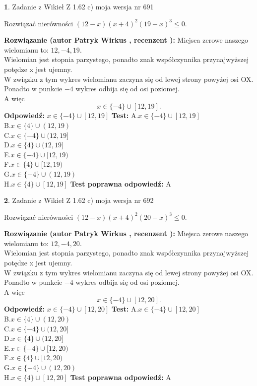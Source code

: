 \documentclass[12pt, a4paper]{article}
\theoremstyle{definition} %
\newtheorem{zad}{}
\newcommand{\zadStart}[1]{\begin{zad}#1\newline}
\newcommand{\zadStop}{\end{zad}}
\newcommand{\rozwStart}[2]{\noindent \textbf{Rozwiązanie (autor #1 , recenzent #2): }\newline}
\newcommand{\rozwStop}{\newline}
\newcommand{\odpStart}{\noindent \textbf{Odpowiedź:}\newline}
\newcommand{\odpStop}{\newline}
\newcommand{\testStart}{\noindent \textbf{Test:}\newline}
\newcommand{\testStop}{\newline}
\newcommand{\kluczStart}{\noindent \textbf{Test poprawna odpowiedź:}\newline}
\newcommand{\kluczStop}{\newline}
\begin{document}
\zadStart{Zadanie z Wikieł Z 1.62 c) moja wersja nr 691}

Rozwiązać nierówności $(12-x)(x+4)^{2}(19-x)^{3}\le0$.
\zadStop
\rozwStart{Patryk Wirkus}{}
Miejsca zerowe naszego wielomianu to: $12, -4, 19$.\\
Wielomian jest stopnia parzystego, ponadto znak współczynnika przy\linebreak najwyższej potędze x jest ujemny.\\ W związku z tym wykres wielomianu zaczyna się od lewej strony powyżej osi OX.\\
Ponadto w punkcie $-4$ wykres odbija się od osi poziomej.\\
A więc $$x \in \{-4\} \cup [12,19].$$
\rozwStop
\odpStart
$x \in \{-4\} \cup [12,19]$
\odpStop
\testStart
A.$x \in \{-4\} \cup [12,19]$\\
B.$x \in \{4\} \cup (12,19)$\\
C.$x \in \{-4\} \cup (12,19]$\\
D.$x \in \{4\} \cup (12,19]$\\
E.$x \in \{-4\} \cup [12,19)$\\
F.$x \in \{4\} \cup [12,19)$\\
G.$x \in \{-4\} \cup (12,19)$\\
H.$x \in \{4\} \cup [12,19]$
\testStop
\kluczStart
A
\kluczStop



\zadStart{Zadanie z Wikieł Z 1.62 c) moja wersja nr 692}

Rozwiązać nierówności $(12-x)(x+4)^{2}(20-x)^{3}\le0$.
\zadStop
\rozwStart{Patryk Wirkus}{}
Miejsca zerowe naszego wielomianu to: $12, -4, 20$.\\
Wielomian jest stopnia parzystego, ponadto znak współczynnika przy\linebreak najwyższej potędze x jest ujemny.\\ W związku z tym wykres wielomianu zaczyna się od lewej strony powyżej osi OX.\\
Ponadto w punkcie $-4$ wykres odbija się od osi poziomej.\\
A więc $$x \in \{-4\} \cup [12,20].$$
\rozwStop
\odpStart
$x \in \{-4\} \cup [12,20]$
\odpStop
\testStart
A.$x \in \{-4\} \cup [12,20]$\\
B.$x \in \{4\} \cup (12,20)$\\
C.$x \in \{-4\} \cup (12,20]$\\
D.$x \in \{4\} \cup (12,20]$\\
E.$x \in \{-4\} \cup [12,20)$\\
F.$x \in \{4\} \cup [12,20)$\\
G.$x \in \{-4\} \cup (12,20)$\\
H.$x \in \{4\} \cup [12,20]$
\testStop
\kluczStart
A
\kluczStop
\end{document}
